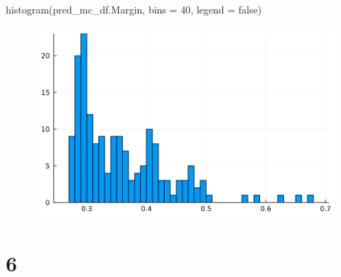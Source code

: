 \documentclass[
  letterpaper,
  DIV=11,
  numbers=noendperiod]{scrreprt}
\newenvironment{Shaded}{\begin{snugshade}}{\end{snugshade}}
\newcommand{\ConstantTok}[1]{\textcolor[rgb]{0.56,0.35,0.01}{#1}}
\newcommand{\FloatTok}[1]{\textcolor[rgb]{0.68,0.00,0.00}{#1}}
\newcommand{\FunctionTok}[1]{\textcolor[rgb]{0.28,0.35,0.67}{#1}}
\newcommand{\NormalTok}[1]{\textcolor[rgb]{0.00,0.23,0.31}{#1}}
\newcommand{\OperatorTok}[1]{\textcolor[rgb]{0.37,0.37,0.37}{#1}}
\begin{document}
\begin{Shaded}
\begin{Highlighting}[]
\FunctionTok{histogram}\NormalTok{(pred\_mc\_df.Margin, bins }\OperatorTok{=} \FloatTok{40}\NormalTok{, legend }\OperatorTok{=} \ConstantTok{false}\NormalTok{)}
\end{Highlighting}
\end{Shaded}

\begin{figure}[H]

{\centering \includegraphics{./demand_estimation_merger_files/figure-pdf/cell-20-output-1.svg}

}

\end{figure}

\hypertarget{section-10}{%
\section{6}\label{section-10}}
\end{document}
